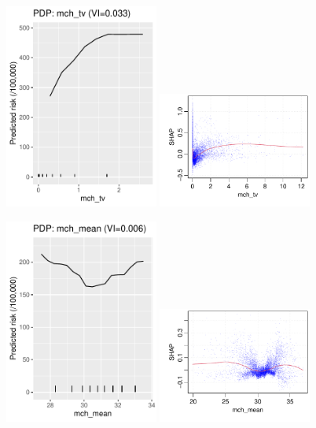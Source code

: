\documentclass[12pt]{article}
\begin{document}
\begin{figure}[h]
\centering
\includegraphics[width=0.45\textwidth]{figures/pdp/mch_tv.pdf}
\includegraphics[width=0.45\textwidth]{figures/shap/mch_tv.pdf}
\end{figure}
\begin{figure}[h]
\centering
\includegraphics[width=0.45\textwidth]{figures/pdp/mch_mean.pdf}
\includegraphics[width=0.45\textwidth]{figures/shap/mch_mean.pdf}
\end{figure}
\end{document}
